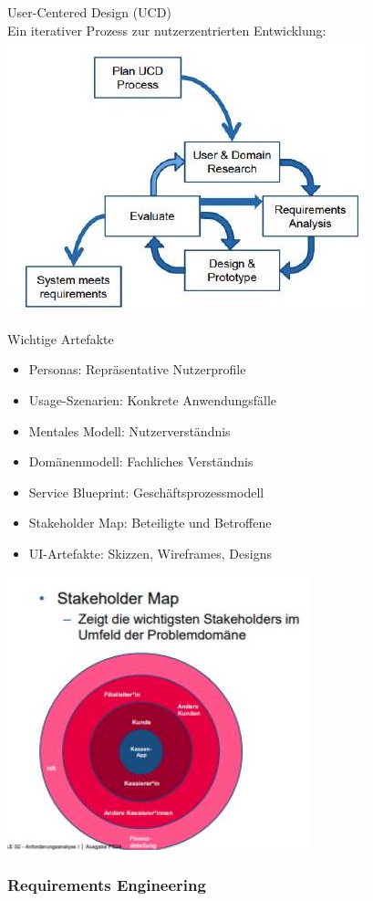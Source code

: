 \begin{concept}{User-Centered Design (UCD)}\\
Ein iterativer Prozess zur nutzerzentrierten Entwicklung:\\
\includegraphics[width=0.6\linewidth]{images/2024_12_29_0d1d7b5551ea1b4b41bdg-03}
\end{concept}
\begin{theorem}{Wichtige Artefakte}
\begin{itemize}
    \item Personas: Repräsentative Nutzerprofile
    \item Usage-Szenarien: Konkrete Anwendungsfälle
    \item Mentales Modell: Nutzerverständnis
    \item Domänenmodell: Fachliches Verständnis
    \item Service Blueprint: Geschäftsprozessmodell
    \item Stakeholder Map: Beteiligte und Betroffene
    \item UI-Artefakte: Skizzen, Wireframes, Designs
\end{itemize}
\includegraphics[width=0.5\linewidth]{images/2024_12_29_0d1d7b5551ea1b4b41bdg-04}
\end{theorem}

\subsubsection{Requirements Engineering}

